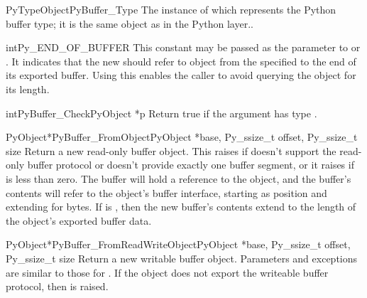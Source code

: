 \begin{cvardesc}{PyTypeObject}{PyBuffer_Type}
  The instance of  which represents the Python
  buffer type; it is the same object as  in the
  Python layer..
\end{cvardesc}

\begin{cvardesc}{int}{Py_END_OF_BUFFER}
  This constant may be passed as the  parameter to
   or
  .  It indicates that the
  new  should refer to  object from
  the specified  to the end of its exported buffer.  Using
  this enables the caller to avoid querying the  object for
  its length.
\end{cvardesc}

\begin{cfuncdesc}{int}{PyBuffer_Check}{PyObject *p}
  Return true if the argument has type .
\end{cfuncdesc}

\begin{cfuncdesc}{PyObject*}{PyBuffer_FromObject}{PyObject *base,
                                                  Py_ssize_t offset, Py_ssize_t size}
  Return a new read-only buffer object.  This raises
   if  doesn't support the read-only
  buffer protocol or doesn't provide exactly one buffer segment, or it
  raises  if  is less than zero. The
  buffer will hold a reference to the  object, and the
  buffer's contents will refer to the  object's buffer
  interface, starting as position  and extending for
   bytes. If  is , then
  the new buffer's contents extend to the length of the 
  object's exported buffer data.
\end{cfuncdesc}

\begin{cfuncdesc}{PyObject*}{PyBuffer_FromReadWriteObject}{PyObject *base,
                                                           Py_ssize_t offset,
                                                           Py_ssize_t size}
  Return a new writable buffer object.  Parameters and exceptions are
  similar to those for .  If the
   object does not export the writeable buffer protocol,
  then  is raised.
\end{cfuncdesc}

